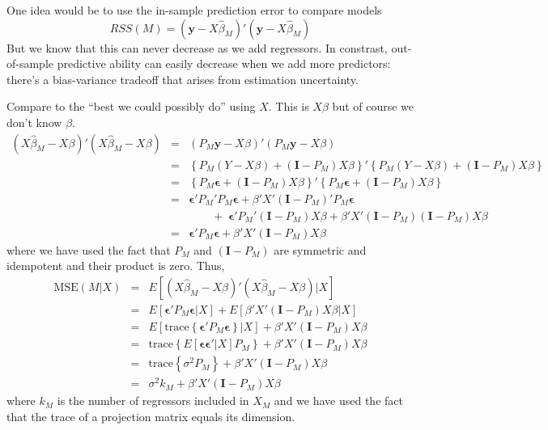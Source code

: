 \documentclass[12pt]{article}
\theoremstyle{definition}
\begin{document}
One idea would be to use the in-sample prediction error to compare models
	$$RSS(M) = (\textbf{y} - X\widehat{\beta}_M)'(\textbf{y} - X\widehat{\beta}_M)$$
But we know that this can never decrease as we add regressors. In constrast, out-of-sample predictive ability can easily decrease when we add more predictors: there's a bias-variance tradeoff that arises from estimation uncertainty.

Compare to the ``best we could possibly do'' using $X$. This is $X\beta$ but of course we don't know $\beta$.
\begin{eqnarray*}
	(X\widehat{\beta}_M - X\beta)'(X\widehat{\beta}_M - X\beta) &=& (P_M \mathbf{y} - X\beta)'(P_M \mathbf{y} - X\beta)\\
		&=&\left\{P_M(Y-X\beta) + (\mathbf{I} - P_M)X\beta \right\}' \left\{P_M(Y-X\beta) + (\mathbf{I} - P_M)X\beta  \right\}\\
		&=&\left\{ P_M \boldsymbol{\epsilon} + (\mathbf{I}- P_M)X\beta\right\}'\left\{ P_M \boldsymbol{\epsilon} + (\mathbf{I}- P_M)X\beta \right\}\\
		&=&\boldsymbol{\epsilon}'P_M'P_M \boldsymbol{\epsilon} + \beta'X'(\mathbf{I}-P_M)'P_M\boldsymbol{\epsilon} \\
			&&\quad \quad + \;\boldsymbol{\epsilon}'P_M'(\mathbf{I} - P_M)X\beta + \beta'X' (\mathbf{I} - P_M)(\mathbf{I} - P_M)X\beta\\
		&=& \boldsymbol{\epsilon}'P_M \boldsymbol{\epsilon} + \beta'X'(\mathbf{I} - P_M)X\beta
\end{eqnarray*}
where we have used the fact that $P_M$ and $(\mathbf{I}-P_M)$ are symmetric and idempotent and their product is zero. Thus,
	\begin{eqnarray*}
		\mbox{MSE}(M|X) &=& E\left[(X\widehat{\beta}_M - X\beta)'(X\widehat{\beta}_M - X\beta)|X \right]\\
		 &=& E\left[\boldsymbol{\epsilon}'P_M \boldsymbol{\epsilon}|X\right] + E\left[\beta'X'(\mathbf{I} - P_M)X\beta |X\right]\\
			&=&E\left[\mbox{trace}\left\{\boldsymbol{\epsilon}'P_M \boldsymbol{\epsilon}\right\}|X\right] + \beta'X'(\mathbf{I} - P_M)X\beta \\
		&=&\mbox{trace}\left\{E[\boldsymbol{\epsilon} \boldsymbol{\epsilon}'|X]P_M\right\} + \beta'X'(\mathbf{I} - P_M)X\beta \\
	&=&\mbox{trace}\left\{\sigma^2 P_M\right\} + \beta'X'(\mathbf{I} - P_M)X\beta \\
	&=& \sigma^2 k_M + \beta'X'(\mathbf{I} - P_M)X\beta
	\end{eqnarray*}
where $k_M$ is the number of regressors included in $X_M$ and we have used the fact that the trace of a projection matrix equals its dimension. 
\end{document}
